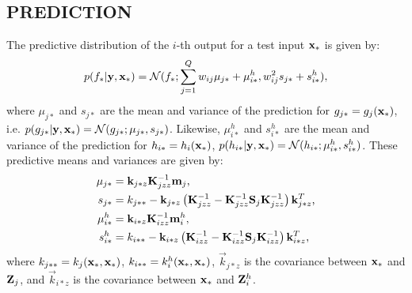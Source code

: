 \subsection{PREDICTION}
The predictive distribution of the $i$-th output for a test input $\mathbf{x}_*$ is given by:
\begin{align}
p(f_* | \mathbf{y}, \mathbf{x}_*) = \mathcal{N}(f_*; \sum_{j=1}^Q w_{ij} \mu_{j*} + \mu^h_{i*}, w_{ij}^2 s_{j*} + s^h_{i*}), 
\end{align}
where $\mu_{j*}$ and $s_{j*}$ are the mean and variance of the prediction for $g_{j*} = g_j(\mathbf{x}_*)$, i.e. $p(g_{j*} | \mathbf{y}, \mathbf{x}_*) = \mathcal{N}(g_{j*}; \mu_{j*}, s_{j*})$.
Likewise, $\mu^h_{i*}$ and $s^h_{i*}$ are the mean and variance of the prediction for $h_{i*} = h_i(\mathbf{x}_*)$, $p(h_{i*} | \mathbf{y}, \mathbf{x}_*) = \mathcal{N}(h_{i*}; \mu^h_{i*}, s^h_{i*})$.
These predictive means and variances are given by: 
\begin{align}
\mu_{j*} &= \mathbf{k}_{j*z} \mathbf{K}_{jzz}^{-1} \mathbf{m}_j  \text{,}\\ 
s_{j*} &= k_{j**} - \mathbf{k}_{j*z} \left(\mathbf{K}_{jzz}^{-1} - \mathbf{K}_{jzz}^{-1} \mathbf{S}_j \mathbf{K}_{jzz}^{-1} \right) \mathbf{k}_{j*z}^T  \text{,}\\
\mu^h_{i*} &= \mathbf{k}_{i*z} \mathbf{K}_{izz}^{-1} \mathbf{m}^h_i \text{,} \\
s^h_{i*} &= k_{i**} - \mathbf{k}_{i*z} \left(\mathbf{K}_{izz}^{-1} - \mathbf{K}_{izz}^{-1} \mathbf{S}_j \mathbf{K}_{izz}^{-1} \right) \mathbf{k}_{i*z}^T \text{,}
\end{align}
where $k_{j**} = k_j(\mathbf{x}_*, \mathbf{x}_*)$, $k_{i**} = k^h_i(\mathbf{x}_*, \mathbf{x}_*)$,  $\vec{k}_{j*z}$ is the covariance between $\mathbf{x}_*$ and $\mathbf{Z}_j$, and $\vec{k}_{i*z}$ is the covariance between $\mathbf{x}_*$ and $\mathbf{Z}^h_i$.

 

